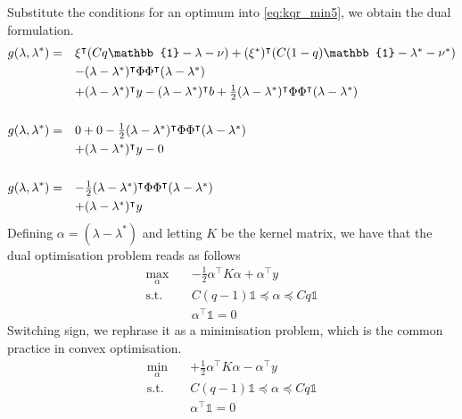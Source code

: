 Substitute the conditions for an optimum into \ref{eq:kqr_min5}, we obtain the dual formulation.
\begin{equation}
    \begin{split}
        g(\lambda, \lambda^*) = \quad & \hbox{$\xi^\intercal(Cq\mathbb{1} - \lambda - \nu) + (\xi^*)^\intercal(C(1-q)\mathbb{1} - \lambda^* - \nu^*)$} \\
        & \hbox{$- (\lambda - \lambda^*)^\intercal \Phi \Phi^\intercal (\lambda - \lambda^*)$} \\
        & \hbox{$+ (\lambda - \lambda^*)^\intercal y - (\lambda - \lambda^*)^\intercal b + \frac{1}{2} (\lambda - \lambda^*)^\intercal \Phi \Phi^\intercal (\lambda - \lambda^*)$} \\
        \\
        g(\lambda, \lambda^*) = \quad & \hbox{$0 + 0 - \frac{1}{2} (\lambda - \lambda^*)^\intercal \Phi \Phi^\intercal (\lambda - \lambda^*)$} \\
        & \hbox{$+ (\lambda - \lambda^*)^\intercal y - 0$} \\
        \\
        g(\lambda, \lambda^*) = \quad & \hbox{$- \frac{1}{2} (\lambda - \lambda^*)^\intercal \Phi \Phi^\intercal (\lambda - \lambda^*)$} \\
        & \hbox{$+ (\lambda - \lambda^*)^\intercal y$}
    \end{split}
\end{equation}
Defining $\alpha=(\lambda-\lambda^*)$ and letting $K$ be the kernel matrix, we have that the dual optimisation problem reads as follows
\begin{equation}\label{eq:kqr_min6}
    \begin{aligned}
        \max_{\alpha} \quad & -\frac{1}{2}\alpha^\intercal K\alpha+\alpha^\intercal y\\
    \textrm{s.t.} \quad & 
    C(q-1)\mathbb{1}\preceq \alpha \preceq Cq\mathbb{1}\\
    &\alpha^\intercal\mathbb{1}=0
    \end{aligned}
    \end{equation}
Switching sign, we rephrase it as a minimisation problem, which is the common practice in convex optimisation.
\begin{equation}\label{eq:kqr_min7}
    \begin{aligned}
        \min_{\alpha} \quad & +\frac{1}{2}\alpha^\intercal K \alpha-\alpha^\intercal y\\
    \textrm{s.t.} \quad & 
    C(q-1)\mathbb{1}\preceq \alpha \preceq Cq\mathbb{1}\\
    &\alpha^\intercal\mathbb{1}=0
    \end{aligned}
    \end{equation}
